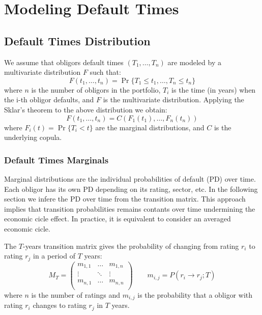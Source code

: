 \documentclass[11pt,fleqn]{book} %
\begin{document}
\chapter{Modeling Default Times}

\section{Default Times Distribution}

We assume that obligors default times $(T_1, \dots, T_n)$ are modeled 
by a multivariate distribution $F$ such that:
\begin{displaymath}
	F(t_1, \dots, t_n) = \Pr \{T_1 \le t_1, \dots, T_n \le t_n\}
\end{displaymath}
where $n$ is the number of obligors in the portfolio, $T_i$ is the time 
(in years) when the i-th obligor defaults, and $F$ is the multivariate
distribution. Applying the Sklar's theorem to the above distribution 
we obtain:
\begin{displaymath}
	F(t_1, \dots, t_n) = C\left(F_1(t_1), \dots, F_n(t_n)\right) 
\end{displaymath}
where $F_i(t) = \Pr\{T_i < t\}$ are the marginal distributions, 
and $C$ is the underlying copula.

\subsection{Default Times Marginals}

Marginal distributions are the individual probabilities of default 
(PD) over time. Each obligor has its own PD depending on its rating,
sector, etc. In the following section we infere the PD over time from 
the transition matrix. This approach implies that transition 
probabilities remains contants over time undermining the economic 
cicle effect. In practice, it is equivalent to consider an averaged 
economic cicle.

\begin{definition} 
	The $T$-years transition matrix gives the probability of changing 
	from rating $r_i$ to rating $r_j$ in a period of $T$ years:
	\begin{displaymath}
		M_T = \left(
		\begin{array}{ccc}
			m_{1,1} & \dots  & m_{1,n} \\
			\vdots  & \ddots & \vdots  \\
			m_{n,1} & \dots  & m_{n,n} \\
		\end{array}
		\right)
		\qquad
		m_{i,j} = P(r_i \to r_j;T)
	\end{displaymath}
	where $n$ is the number of ratings and $m_{i,j}$ is the probability that a
	obligor with rating $r_i$ changes to rating $r_j$ in $T$ years.
\end{definition}
\end{document}
